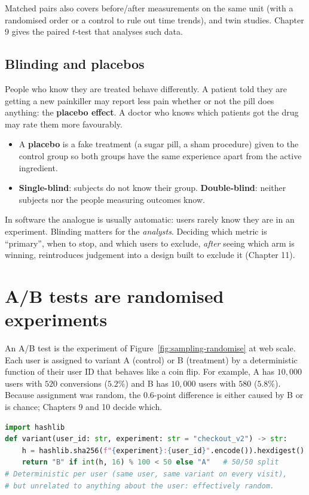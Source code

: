 Matched pairs also covers before/after measurements on the same unit (with a
randomised order or a control to rule out time trends), and twin studies. Chapter 9
gives the paired $t$-test that analyses such data.

\subsection{Blinding and placebos}

People who know they are treated behave differently. A patient told they are getting a
new painkiller may report less pain whether or not the pill does anything: the
\textbf{placebo effect}. A doctor who knows which patients got the drug may rate them
more favourably.

\begin{itemize}
  \item A \textbf{placebo} is a fake treatment (a sugar pill, a sham procedure) given to
  the control group so both groups have the same experience apart from the active
  ingredient.
  \item \textbf{Single-blind}: subjects do not know their group.
  \textbf{Double-blind}: neither subjects nor the people measuring outcomes know.
\end{itemize}

In software the analogue is usually automatic: users rarely know they are in an
experiment. Blinding matters for the \emph{analysts}. Deciding which metric is
``primary'', when to stop, and which users to exclude, \emph{after} seeing which arm is
winning, reintroduces judgement into a design built to exclude it (Chapter 11).

\section{A/B tests are randomised experiments}
\label{sec:sampling-ab}

An A/B test is the experiment of Figure~\ref{fig:sampling-randomise} at web scale. Each
user is assigned to variant A (control) or B (treatment) by a deterministic function of
their user ID that behaves like a coin flip. For example, A has $10{,}000$ users with
$520$ conversions ($5.2\%$) and B has $10{,}000$ users with $580$ ($5.8\%$). Because
assignment was random, the $0.6$-point difference is either caused by B or is chance;
Chapters 9 and 10 decide which.

\begin{lstlisting}[language=Python]
import hashlib
def variant(user_id: str, experiment: str = "checkout_v2") -> str:
    h = hashlib.sha256(f"{experiment}:{user_id}".encode()).hexdigest()
    return "B" if int(h, 16) % 100 < 50 else "A"   # 50/50 split
# Deterministic per user (same user, same variant on every visit),
# but unrelated to anything about the user: effectively random.
\end{lstlisting}

